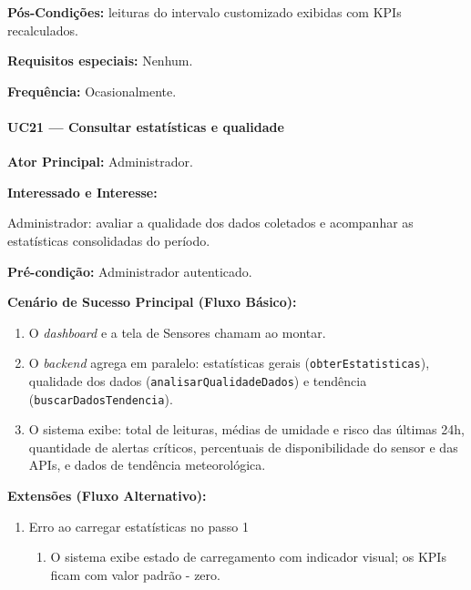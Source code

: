 \textbf{Pós-Condições:} leituras do intervalo customizado
exibidas com KPIs recalculados.

\textbf{Requisitos especiais:} Nenhum.

\textbf{Frequência:} Ocasionalmente.

\paragraph{UC21 --- Consultar estatísticas e qualidade}\hfill\break

\textbf{Ator Principal:} Administrador.

\textbf{Interessado e Interesse:}

Administrador: avaliar a qualidade dos dados coletados e
acompanhar as estatísticas consolidadas do período.

\textbf{Pré-condição:} Administrador autenticado.

\textbf{Cenário de Sucesso Principal (Fluxo Básico):}
\begin{enumerate}
  \item O \textit{dashboard} e a tela de Sensores chamam
        ao montar.
  \item O \textit{backend} agrega em paralelo: estatísticas
        gerais (\texttt{obterEstatisticas}), qualidade dos
        dados (\texttt{analisarQualidadeDados}) e tendência
        (\texttt{buscarDadosTendencia}).
  \item O sistema exibe: total de leituras, médias de
        umidade e risco das últimas 24h, quantidade de
        alertas críticos, percentuais de disponibilidade
        do sensor e das APIs, e dados de tendência
        meteorológica.
\end{enumerate}

\textbf{Extensões (Fluxo Alternativo):}

\begin{enumerate}
  \renewcommand{\theenumi}{1a}
  \renewcommand{\labelenumi}{\theenumi.}
  \item Erro ao carregar estatísticas no passo 1
  \begin{enumerate}
  \item O sistema exibe estado de carregamento com
        indicador visual; os KPIs ficam com valor padrão - zero.
  \end{enumerate}
\end{enumerate}

